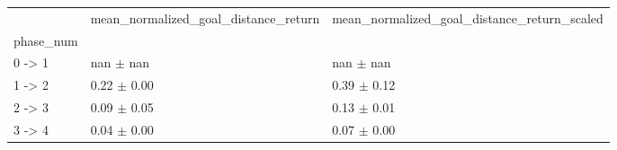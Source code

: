 \begin{tabular}{lll}
\toprule
 & mean_normalized_goal_distance_return & mean_normalized_goal_distance_return_scaled \\
phase_num &  &  \\
\midrule
0 -> 1 & nan $\pm$ nan & nan $\pm$ nan \\
1 -> 2 & 0.22 $\pm$ 0.00 & 0.39 $\pm$ 0.12 \\
2 -> 3 & 0.09 $\pm$ 0.05 & 0.13 $\pm$ 0.01 \\
3 -> 4 & 0.04 $\pm$ 0.00 & 0.07 $\pm$ 0.00 \\
\bottomrule
\end{tabular}
